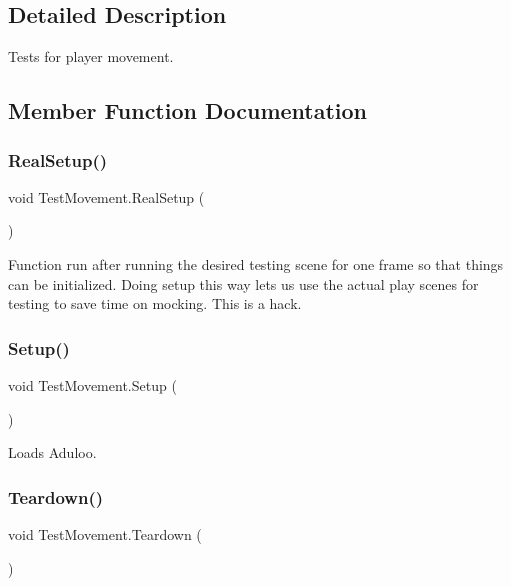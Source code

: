 \subsection{Detailed Description}
Tests for player movement. 



\subsection{Member Function Documentation}
\mbox{\label{class_test_movement_a62ef8c8115a8bbce2274cbda3f92eb5e}} 
\subsubsection{\texorpdfstring{Real\+Setup()}{RealSetup()}}
{\footnotesize\ttfamily void Test\+Movement.\+Real\+Setup (\begin{DoxyParamCaption}{ }\end{DoxyParamCaption})}



Function run after running the desired testing scene for one frame so that things can be initialized. Doing setup this way lets us use the actual play scenes for testing to save time on mocking. This is a hack. 

\mbox{\label{class_test_movement_ac3b7b7f9394bdfebb7dd09ee94de48cb}} 
\subsubsection{\texorpdfstring{Setup()}{Setup()}}
{\footnotesize\ttfamily void Test\+Movement.\+Setup (\begin{DoxyParamCaption}{ }\end{DoxyParamCaption})}



Loads Aduloo. 

\mbox{\label{class_test_movement_aabeb3beb5a4c82191e651aaafd25961b}} 
\subsubsection{\texorpdfstring{Teardown()}{Teardown()}}
{\footnotesize\ttfamily void Test\+Movement.\+Teardown (\begin{DoxyParamCaption}{ }\end{DoxyParamCaption})}



